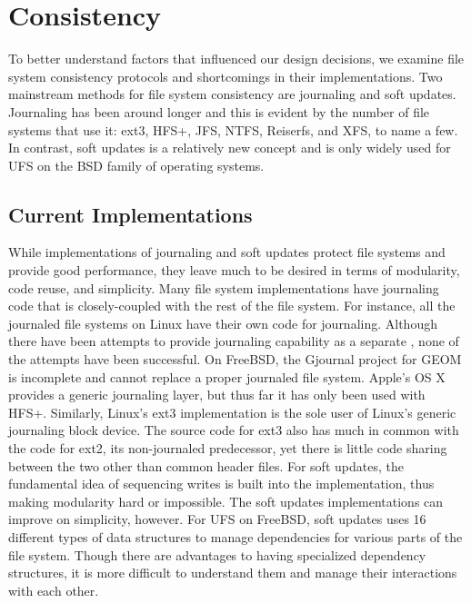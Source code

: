 \section{Consistency}
\label{sec:consistency}

To better understand factors that influenced our design decisions, we examine
file system consistency protocols and shortcomings in their implementations.
Two mainstream methods for file system consistency are journaling and soft
updates. Journaling has been around longer and this is evident by the number of
file systems that use it: ext3, HFS+, JFS, NTFS, Reiserfs, and XFS, to name a
few. In contrast, soft updates is a relatively new concept and is only widely
used for UFS on the BSD family of operating systems.





\subsection{Current Implementations}
\label{sec:consistency:implementations}
While implementations of journaling and soft updates protect file systems
and provide good performance, they leave much to be desired in terms of
modularity, code reuse, and simplicity. Many file system implementations have
journaling code that is closely-coupled with the rest of the file system.
For instance, all the journaled file systems on Linux have their own code for
journaling. Although there have been attempts to provide journaling capability
as a separate \module, none of the attempts have been successful. On FreeBSD,
the Gjournal project for GEOM is incomplete and cannot replace a proper
journaled file system. Apple's OS X provides a generic journaling layer, but
thus far it has only been used with HFS+. Similarly, Linux's ext3
implementation is the sole user of Linux's generic journaling block device.
The source code for ext3 also has much in common with the code for ext2, its
non-journaled predecessor, yet there is little code sharing between the two
other than common header files. For soft updates, the fundamental idea of
sequencing writes is built into the implementation, thus making modularity
hard or impossible. The soft updates implementations can improve on
simplicity, however. For UFS on FreeBSD, soft updates uses 16 different types
of data structures to manage dependencies for various parts of the file
system. Though there are advantages to having specialized dependency
structures, it is more difficult to understand them and manage their
interactions with each other.

